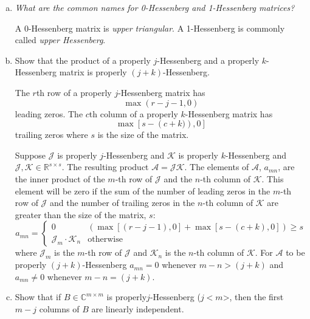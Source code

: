 \documentclass[10pt,letterpaper]{article}
\begin{document}
\begin{enumerate}[(a)]
    \item \emph{What are the common names for 0-Hessenberg and 1-Hessenberg matrices?}

    A 0-Hessenberg matrix is \emph{upper triangular}.  A 1-Hessenberg is commonly called \emph{upper Hessenberg}.

    \item Show that the product of a properly $j$-Hessenberg and a properly $k$-Hessenberg matrix is properly $\left(j+k\right)$-Hessenberg.\label{itm:j+k}

    The $r$th row of a properly $j$-Hessenberg matrix has
    \begin{equation*}
        \max\left(r-j-1,0\right)
    \end{equation*}
    leading zeros.  The $c$th column of a properly $k$-Hessenberg matrix has
    \begin{equation*}
        \max\left[s-\left(c+k)\right),0\right]
    \end{equation*}
    trailing zeros where $s$ is the size of the matrix.

    Suppose $\mathcal{J}$ is properly $j$-Hessenberg and $\mathcal{K}$ is properly $k$-Hessenberg and $\mathcal{J},\mathcal{K} \in \mathbb{R}^{s\times s}$.  The resulting product $\mathcal{A} = \mathcal{JK}$.  The elements of $\mathcal{A}$, $a_{mn}$, are the inner product of the $m$-th row of $\mathcal{J}$ and the $n$-th column of $\mathcal{K}$.  This element will be zero if the sum of the number of leading zeros in the $m$-th row of $\mathcal{J}$ and the number of trailing zeros in the $n$-th column of $\mathcal{K}$ are greater than the size of the matrix, $s$:
    \begin{equation}
        a_{mn} = \begin{cases}
            0 & \left( \max\left[(r-j-1),0\right] + \max\left[s-\left(c+k\right),0\right] \right) \geq s \\
            \mathcal{J}_m\cdot\mathcal{K}_n & \mathrm{otherwise}
        \end{cases}
    \end{equation}
    where $\mathcal{J}_m$ is the $m$-th row of $\mathcal{J}$ and $\mathcal{K}_n$ is the $n$-th column of $\mathcal{K}$.  For $\mathcal{A}$ to be properly $\left(j+k\right)$-Hessenberg $a_{mn} = 0$ whenever $m-n>\left(j+k\right)$ and $a_{mn}\neq 0$ whenever $m-n = \left(j+k\right)$.

    \item  Show that if $B \in \mathbb{C}^{m\times m}$ is properly$j$-Hessenberg ($j<m$>, then the first $m-j$ columns of $B$ are linearly independent.
    

\end{enumerate}
\end{document}

